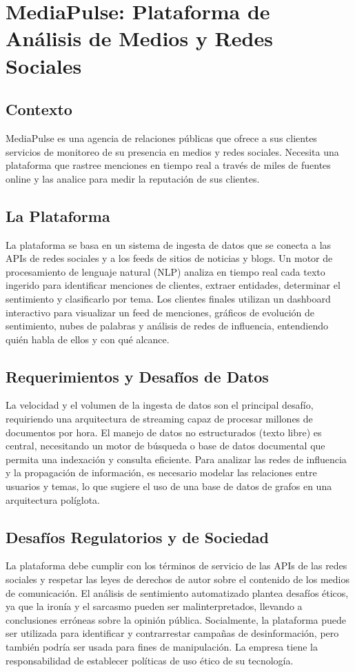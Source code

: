 \documentclass[12pt]{article}
\begin{document}
\newpage

\section{MediaPulse: Plataforma de Análisis de Medios y Redes Sociales}

\subsection{Contexto}
MediaPulse es una agencia de relaciones públicas que ofrece a sus clientes servicios de monitoreo de su presencia en medios y redes sociales. Necesita una plataforma que rastree menciones en tiempo real a través de miles de fuentes online y las analice para medir la reputación de sus clientes.

\subsection{La Plataforma}
La plataforma se basa en un sistema de ingesta de datos que se conecta a las APIs de redes sociales y a los feeds de sitios de noticias y blogs. Un motor de procesamiento de lenguaje natural (NLP) analiza en tiempo real cada texto ingerido para identificar menciones de clientes, extraer entidades, determinar el sentimiento y clasificarlo por tema. Los clientes finales utilizan un dashboard interactivo para visualizar un feed de menciones, gráficos de evolución de sentimiento, nubes de palabras y análisis de redes de influencia, entendiendo quién habla de ellos y con qué alcance.

\subsection{Requerimientos y Desafíos de Datos}
La velocidad y el volumen de la ingesta de datos son el principal desafío, requiriendo una arquitectura de streaming capaz de procesar millones de documentos por hora. El manejo de datos no estructurados (texto libre) es central, necesitando un motor de búsqueda o base de datos documental que permita una indexación y consulta eficiente. Para analizar las redes de influencia y la propagación de información, es necesario modelar las relaciones entre usuarios y temas, lo que sugiere el uso de una base de datos de grafos en una arquitectura políglota.

\subsection{Desafíos Regulatorios y de Sociedad}
La plataforma debe cumplir con los términos de servicio de las APIs de las redes sociales y respetar las leyes de derechos de autor sobre el contenido de los medios de comunicación. El análisis de sentimiento automatizado plantea desafíos éticos, ya que la ironía y el sarcasmo pueden ser malinterpretados, llevando a conclusiones erróneas sobre la opinión pública. Socialmente, la plataforma puede ser utilizada para identificar y contrarrestar campañas de desinformación, pero también podría ser usada para fines de manipulación. La empresa tiene la responsabilidad de establecer políticas de uso ético de su tecnología.
\end{document}
